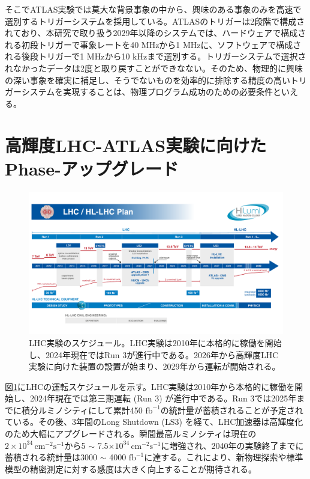 そこでATLAS実験では莫大な背景事象の中から、興味のある事象のみを高速で選別するトリガーシステムを採用している。ATLASのトリガーは2段階で構成されており、本研究で取り扱う2029年以降のシステムでは、ハードウェアで構成される初段トリガーで事象レートを40 MHzから1 MHzに、ソフトウェアで構成される後段トリガーで1 MHzから10 kHzまで選別する。トリガーシステムで選択されなかったデータは2度と取り戻すことができなない。そのため、物理的に興味の深い事象を確実に補足し、そうでないものを効率的に排除する精度の高いトリガーシステムを実現することは、物理プログラム成功のための必要条件といえる。


\section{高輝度LHC-ATLAS実験に向けたPhase-\two アップグレード}
\label{sec_intro_phase2upgrade}

\begin{figure} 
\centering
\includegraphics[width=16cm]{fig/Intro/LHCschedule.pdf}
\caption[LHC実験のスケージュール]{LHC実験のスケジュール\cite{cern_hllhc_industry}。LHC実験は2010年に本格的に稼働を開始し、2024年現在ではRun 3が進行中である。2026年から高輝度LHC実験に向けた装置の設置が始まり、2029年から運転が開始される。}
\label{LHCschedule}
\end{figure}

図\ref{LHCschedule}にLHCの運転スケジュールを示す。LHC実験は2010年から本格的に稼働を開始し、2024年現在では第三期運転 (Run 3) が進行中である。Run 3では2025年までに積分ルミノシティにして累計450 $\mathrm{fb}^{-1}$の統計量が蓄積されることが予定されている。その後、3年間のLong Shutdown (LS3) を経て、LHC加速器は高輝度化のため大幅にアプグレードされる。瞬間最高ルミノシティは現在の$2\times10^{34}\,\mathrm{cm}^{-2}\mathrm{s}^{-1}$から5 $\sim$ 7.5$\times10^{34}\,\mathrm{cm}^{-2}\mathrm{s}^{-1}$に増強され、2040年の実験終了までに蓄積される統計量は3000  $\sim$ 4000 $\mathrm{fb}^{-1}$に達する。これにより、新物理探索や標準模型の精密測定に対する感度は大きく向上することが期待される。

